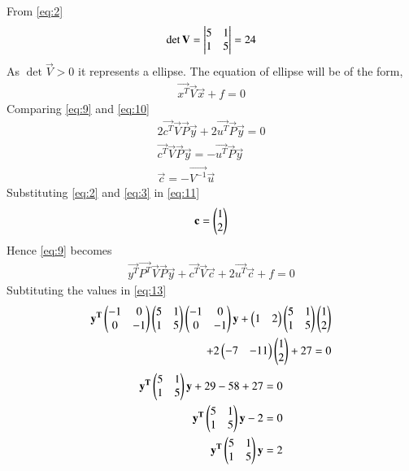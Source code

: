 \documentclass[journal,12pt,twocolumn]{IEEEtran}
\begin{document}
From \eqref{eq:2}
\begin{align}
\det{\mathbf{V}} = \begin{vmatrix}5&1\\1&5\end{vmatrix} = 24
\end{align}
As $\det{\vec{V}} >0$ it represents a ellipse. The equation of ellipse will be of the form,
\begin{align}
\vec{x^T}\vec{V}\vec{x} +f =0 \label{eq:10}
\end{align}
Comparing \eqref{eq:9} and \eqref{eq:10}
\begin{align}
2\vec{c^T}\vec{V}\vec{P}\vec{y} + 2\vec{u^T}\vec{P}\vec{y} =0\\
\vec{c^T}\vec{V}\vec{P}\vec{y} = - \vec{u^T}\vec{P}\vec{y}\\
\vec{c} = -\vec{V^{-1}}\vec{u}\label{eq:11}
\end{align}
Substituting \eqref{eq:2} and \eqref{eq:3} in \eqref{eq:11}
\begin{align}
\mathbf{c}= \begin{pmatrix}1\\2\end{pmatrix} \label{eq:12}
\end{align}
Hence \eqref{eq:9} becomes
\begin{align}
\vec{y^T}\vec{P^T}\vec{V}\vec{P}\vec{y}+\vec{c^T}\vec{V}\vec{c} +2\vec{u^T}\vec{c} + f =  0 \label{eq:13}
\end{align}
Subtituting the values in \eqref{eq:13}
\begin{align}
\mathbf{y^T}\begin{pmatrix}-1&0\\0&-1\end{pmatrix}\begin{pmatrix}5&1\\1&5\end{pmatrix}\begin{pmatrix}-1&0\\0&-1\end{pmatrix}\mathbf{y}+\begin{pmatrix}1&2\end{pmatrix}\begin{pmatrix}5&1\\1&5\end{pmatrix}\begin{pmatrix}1\\2\end{pmatrix}\nonumber\\+2\begin{pmatrix}-7&-11\end{pmatrix}\begin{pmatrix}1\\2\end{pmatrix}+27 = 0
\end{align}
\begin{align}
\mathbf{y^T}\begin{pmatrix}5&1\\1&5\end{pmatrix}\mathbf{y}+29-58+27=0\\
\mathbf{y^T}\begin{pmatrix}5&1\\1&5\end{pmatrix}\mathbf{y}-2=0\\
\mathbf{y^T}\begin{pmatrix}5&1\\1&5\end{pmatrix}\mathbf{y} = 2
\end{align}
\end{document}
